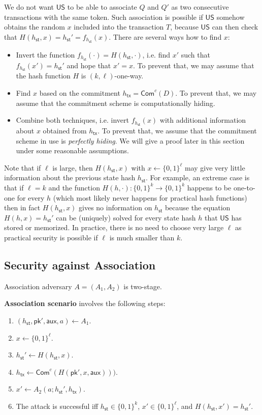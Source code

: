 \documentclass{article}
\newcommand{\pubkey}[0]{\mathsf{pk}}
\newcommand{\commitc}[0]{\mathsf{Com}^{c}}
\newcommand{\unisrv}[0]{\mathsf{US}}
\newcommand{\sthash}[0]{h_\mathsf{st}}
\newcommand{\txhash}[0]{h_\mathsf{tx}}
\newcommand{\auxd}[0]{\mathsf{aux}}
\begin{document}
We do not want $\unisrv$ to be able to associate $Q$ and $Q'$ as two consecutive transactions with the same token. Such association is possible if $\unisrv$ somehow obtains the random $x$ included into the transaction $T$, because $\unisrv$ can then check that $H(\sthash,x)=\sthash'=f_{\sthash}(x)$. There are several ways how to find $x$:
\begin{itemize}
\item Invert the function $f_{\sthash}(\cdot)=H(\sthash,\cdot)$, i.e. find $x'$ such that $f_{\sthash}(x')=\sthash'$ and hope that $x'=x$. To prevent that, we may assume that the hash function $H$ is $(k,\ell)$-one-way.
\item Find $x$ based on the commitment $\txhash=\commitc(D)$. To prevent that, we may assume that the commitment scheme is computationally hiding.
\item Combine both techniques, i.e. invert $f_{\sthash}(x)$ with additional information about $x$ obtained from $\txhash$. To prevent that, we assume that the commitment scheme in use is \emph{perfectly hiding}. We will give a proof later in this section under some reasonable assumptions.
\end{itemize}

\noindent Note that if $\ell$ is large, then $H(\sthash,x)$ with $x\gets \{0,1\}^\ell$ may give very little information about the previous state hash $\sthash$.
For example, an extreme case is that if $\ell=k$ and the function $H(h,\cdot)\colon \{0,1\}^k\rightarrow \{0,1\}^k$ happens to be one-to-one for every $h$ (which most likely never happens for practical hash functions) then in fact $H(\sthash,x)$ gives no information on $\sthash$  because the equation $H(h,x)=\sthash'$ can be (uniquely) solved for every state hash $h$ that $\unisrv$ has stored or memorized. In practice, there is no need to choose very large $\ell$ as practical security is possible if $\ell$ is much smaller than $k$.

\subsection{Security against Association}

Association adversary $A=(A_1,A_2)$ is two-stage. \medskip

\noindent\textbf{Association scenario} involves the following steps:
\begin{enumerate}
\item $(\sthash, \pubkey', \auxd, a)\gets A_1$.
\item $x\gets \{0,1\}^\ell$.
\item $\sthash'\gets H(\sthash,x)$.
\item $\txhash\gets\commitc(H(\pubkey',x,\auxd)))$.
\item $x'\gets A_2(a; \sthash',\txhash)$.
\item The attack is successful iff $\sthash\in\{0,1\}^k$, $x'\in\{0,1\}^\ell$, and $H(\sthash,x')=\sthash'$.
\end{enumerate}
\end{document}
